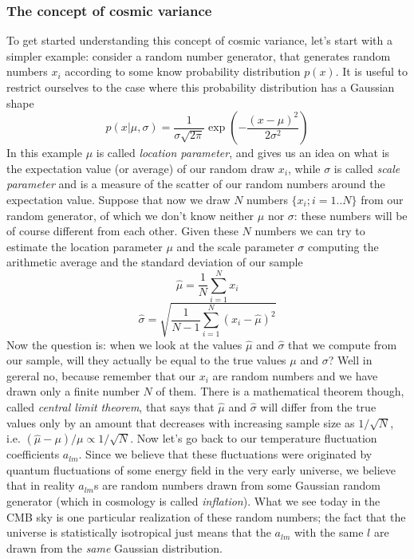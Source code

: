 \documentclass[11pt, a4paper,oneside,openright]{book}
\numberwithin{equation}{section}
\begin{document}
\subsubsection{The concept of cosmic variance}
%
To get started understanding this concept of cosmic variance, let's start with a simpler example: consider a random number generator, that generates random numbers $x_i$ according to some know probability distribution $p(x)$. It is useful to restrict ourselves to the case where this probability distribution has a Gaussian shape
\begin{equation}
p(x\vert\mu,\sigma)=\frac{1}{\sigma\sqrt{2\pi}}\exp{\left(-\frac{(x-\mu)^2}{2\sigma^2}\right)}
\end{equation} 
%
In this example $\mu$ is called \textit{location parameter}, and gives us an idea on what is the expectation value (or average) of our random draw $x_i$, while $\sigma$ is called \textit{scale parameter} and is a measure of the scatter of our random numbers around the expectation value. Suppose that now we draw $N$ numbers $\{x_i;i=1..N\}$ from our random generator, of which we don't know neither $\mu$ nor $\sigma$: these numbers will be of course different from each other. Given these $N$ numbers we can try to estimate the location parameter $\mu$ and the scale parameter $\sigma$ computing the arithmetic average and the standard deviation of our sample
\begin{equation}
\hat{\mu}=\frac{1}{N}\sum_{i=1}^Nx_i
\end{equation}
\begin{equation}
\hat{\sigma}=\sqrt{\frac{1}{N-1}\sum_{i=1}^N(x_i-\hat{\mu})^2}
\end{equation}
%
Now the question is: when we look at the values $\hat{\mu}$ and $\hat{\sigma}$ that we compute from our sample, will they actually be equal to the true values $\mu$ and $\sigma$? Well in gereral no, because remember that our $x_i$ are random numbers and we have drawn only a finite number $N$ of them. There is a mathematical theorem though, called \textit{central limit theorem}, that says that $\hat{\mu}$ and $\hat{\sigma}$ will differ from the true values only by an amount that decreases with increasing sample size as $1/\sqrt{N}$, i.e. $(\hat{\mu}-\mu)/\mu\propto1/\sqrt{N}$. Now let's go back to our temperature fluctuation coefficients $a_{lm}$. 
Since we believe that these fluctuations were originated by quantum fluctuations of some energy field in the very early universe, we believe that in reality $a_{lm}$s are random numbers drawn from some Gaussian random generator (which in cosmology is called \textit{inflation}). What we see today in the CMB sky is one particular realization of these random numbers; the fact that the universe is statistically isotropical just means that the $a_{lm}$ with the same $l$ are drawn from the \textit{same} Gaussian distribution. 
\end{document}
